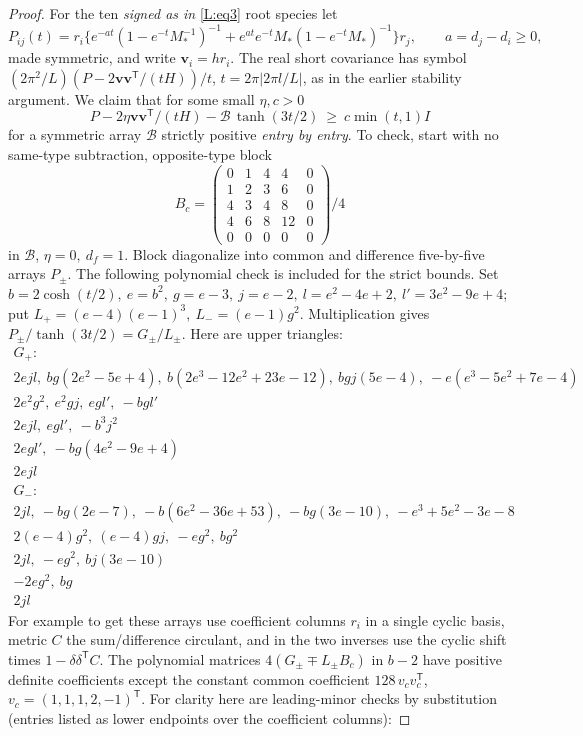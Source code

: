 \begin{proof}
For the ten \emph{signed as in} \eqref{L:eq3} root species let
\[
 P_{ij}(t)
 =r_i\{ e^{-a t}(1-e^{-t}M_*^{-1})^{-1}
       + e^{a t} e^{-t}M_*(1-e^{-t}M_*)^{-1}\}r_j,\qquad a=d_j-d_i\ge0,
\]
made symmetric, and write \(\mathbf v_i=h r_i\). The real short covariance has symbol \((2\pi^2/L)(P-2\mathbf v\mathbf v^{\mathsf T}/(tH))/t\), \(t=2\pi|2\pi l/L|\), as in the earlier stability argument. We claim that for some small \(\eta,c>0\)
\begin{equation}
 P-2\eta\mathbf v\mathbf v^{\mathsf T}/(tH)
      -\mathscr B\,\tanh(3t/2)\ \ge\ c\min(t,1)I\label{L:eq5}
\end{equation}
for a symmetric array \(\mathscr B\) strictly positive \emph{entry by entry}. To check, start with no same-type subtraction, opposite-type block
\[
 B_c=\begin{pmatrix}
0&1&4&4&0\\1&2&3&6&0\\4&3&4&8&0\\4&6&8&12&0\\0&0&0&0&0
\end{pmatrix}/4
\]
in \(\mathscr B\), \(\eta=0,\ d_f=1\). Block diagonalize into common and difference five-by-five arrays \(P_\pm\). The following polynomial check is included for the strict bounds. Set \(b=2\cosh(t/2),\ e=b^2,\ g=e-3,\ j=e-2,\ l=e^2-4e+2,\ l'=3e^2-9e+4\); put \(L_+=(e-4)(e-1)^3,\ L_-=(e-1)g^2\). Multiplication gives \(P_\pm/\tanh(3t/2)=G_\pm/L_\pm\). Here are upper triangles:
\[
\begin{array}{l}
G_+:\\
2 e j l,\ b g(2e^2-5e+4),\ b(2e^3-12e^2+23e-12),\ b g j(5e-4),\
 -e(e^3-5e^2+7e-4)\\
2e^2g^2,\ e^2g j,\ e g l',\ -b g l'\\
2e j l,\ e g l',\ -b^3 j^2\\
2e g l',\ -b g(4e^2-9e+4)\\
2e j l\\[2pt]
G_-:\\
2j l,\ -b g(2e-7),\ -b(6e^2-36e+53),\ -b g(3e-10),\ -e^3+5e^2-3e-8\\
2(e-4)g^2,\ (e-4)g j,\ -e g^2,\ b g^2\\
2j l,\ -e g^2,\ b j(3e-10)\\
-2e g^2,\ b g\\
2j l
\end{array}
\]
For example to get these arrays use coefficient columns \(r_i\) in a single cyclic basis, metric \(C\) the sum/difference circulant, and in the two inverses use the cyclic shift times \(1-\delta\delta^{\mathsf T}C\). The polynomial matrices \(4(G_\pm\mp L_\pm B_c)\) in \(b-2\) have positive definite coefficients except the constant common coefficient \(128\,v_c v_c^{\mathsf T}\), \(v_c=(1,1,1,2,-1)^{\mathsf T}\). For clarity here are leading-minor checks by substitution (entries listed as lower endpoints over the coefficient columns):

\end{proof}

